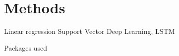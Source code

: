 
\section{Methods}

Linear regression
Support Vector
Deep Learning, LSTM

Packages used















